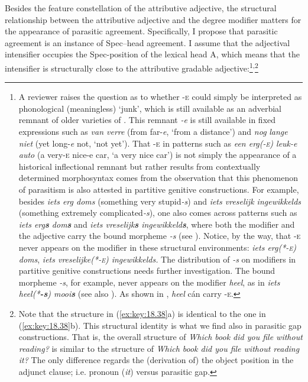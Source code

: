 \documentclass[output=paper]{langsci/langscibook}
\begin{document}
Besides the feature constellation of the attributive adjective, the structural
relationship between the attributive adjective and the degree modifier matters
for the appearance of parasitic agreement. Specifically, I propose that
parasitic agreement is an instance of Spec--head agreement. I assume that the
adjectival intensifier occupies the Spec-position of the lexical head A, which
means that the intensifier is structurally close to the attributive gradable
adjective:\footnote{A reviewer raises the question as to whether \textsc{-e}
could simply be interpreted as phonological (meaningless) \enquote*{junk},
which is still available as an adverbial remnant of older varieties of
. This remnant \emph{-e} is still available in fixed expressions
such as \emph{van verre} (from far-\emph{e}, \enquote*{from a distance}) and
\emph{nog} \emph{lange} \emph{niet} (yet long-\emph{e} not, \enquote*{not
yet}). That \textsc{-e}  in patterns such as \emph{een erg(\textsc{-e}) leuk-e
auto} (a very\textsc{-e} nice-e car, \enquote*{a very nice car}) is not simply
the appearance of a historical inflectional remnant but rather results from
contextually determined morphosyntax comes from the observation that this
phenomenon of parasitism is also attested in partitive genitive constructions. For example, besides \emph{iets erg doms} (something very
stupid\emph{-s}) and \emph{iets vreselijk ingewikkelds} (something extremely
complicated\emph{-s}), one also comes across patterns such as \emph{iets
erg\textbf{s} dom\textbf{s}} and \emph{iets vreselijk\textbf{s}
ingewikkeld\textbf{s}}, where both the modifier and the adjective carry the
bound morpheme \emph{-s} (see \citealt{Royen1948}). Notice, by the way, that
\textsc{-e} never appears on the modifier in these structural environments:
\emph{iets erg(*-\textsc{e}) doms}, \emph{iets vreselijke(*\textsc{-e})
ingewikkelds.} The distribution of \emph{-s} on modifiers in partitive
genitive constructions needs further investigation. The bound
morpheme \emph{-s}, for example, never appears on the modifier \emph{heel}, as
in \emph{iets heel(*\textbf{-s}) mooi\textbf{s}} (see also
\citealt[423]{Broekhuis2013}). As shown in , \emph{heel} cán
carry \textsc{-e}.}\textsuperscript{,}\footnote{Note that the structure in (\ref{ex:key:18.38}a) is
identical to the one in (\ref{ex:key:18.38}b). This structural identity is what we
find also in parasitic gap constructions. That is, the overall structure of
\emph{Which book did you file without reading?} is similar to the structure of
\emph{Which book did you file without reading it?} The only difference regards
the (derivation of) the object position in the adjunct clause; i.e. pronoun
(\emph{it}) versus parasitic gap.}
\end{document}
